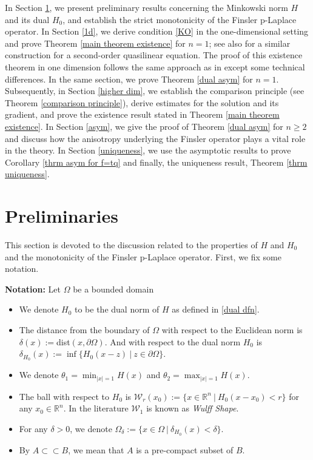 \documentclass[11pt]{amsart}
\newcommand{\R}{\mathbb{R}}
\numberwithin{equation}{section}
\begin{document}
   In Section \ref{prilms}, we present preliminary results concerning the Minkowski norm $H$ and its dual $H_{0}$, and establish the strict monotonicity of the Finsler p-Laplace operator. In Section \ref{1d}, we derive condition \ref{KO} in the one-dimensional setting and prove Theorem \ref{main theorem existence} for $n=1$; see also \cite{DattaIndro2026} for a similar construction for a second-order quasilinear equation. The proof of this existence theorem in one dimension follows the same approach as in \cite{DattaIndro2026} except some technical differences. In the same section, we prove Theorem \ref{dual asym} for $n=1$.
Subsequently, in Section \ref{higher dim}, we establish the comparison principle (see Theorem \ref{comparison principle}), derive estimates for the solution and its gradient, and prove the existence result stated in Theorem \ref{main theorem existence}. In Section \ref{asym}, we give the proof of Theorem \ref{dual asym} for $n\geq2$ and discuss how the anisotropy underlying the Finsler operator plays a vital role in the theory. In Section \ref{uniqueness}, we use the asymptotic results to prove Corollary  \ref{thrm asym for f=tq} and finally, the uniqueness result, Theorem \ref{thrm uniqueness}.



\section{Preliminaries}\label{prilms}
This section is devoted to the discussion related to the properties of $H$ and $H_{0}$ and the monotonicity of the Finsler p-Laplace operator. First, we fix some notation.


 \textbf{Notation:}
Let $\Omega$ be a bounded domain
\begin{itemize}
\item We denote $H_{0}$ to be the dual norm of $H$ as defined in \eqref{dual dfn}.
    \item The distance from the boundary of $\Omega$ with respect to the Euclidean norm is $\delta(x):=$dist$(x,\partial\Omega)$. And with respect to the dual norm $H_{0}$ is $\delta_{H_{0}}(x):=\inf\{H_{0}(x-z)~|~z\in \partial\Omega\}$.
    \item We denote $\theta_{1}=\min_{|x|=1}H(x)$ and $\theta_{2}=\max_{|x|=1}H(x)$.
    \item The ball with respect to $H_{0}$ is $\mathcal{W}_{r}(x_{0}):=\{x\in \R^{n}~|~ H_{0}(x-x_{0})<r\}$ for any $x_{0}\in \R^{n}$. In the literature $\mathcal{W}_{1}$ is known as \textit{Wulff Shape}. 
    \item For any $\delta>0$, we denote $\Omega_{\delta}:=\{x\in \Omega~|~\delta_{H_{0}}(x)<\delta\}$.
    \item By $A\subset\subset B$, we mean that $A$ is a pre-compact subset of $B$.
\end{itemize}
\end{document}
